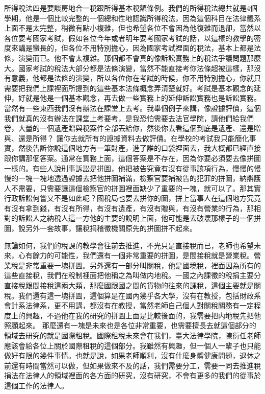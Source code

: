 \documentclass[]{ctexbook}
\begin{document}
所得稅法四是要談房地合一稅跟所得基本稅額條例。我們的所得稅法總共就是4個學期，他是一個比較完整的一個總和性地認識所得稅法，因為這個科目在法律體系上面不是太完整，稍微有點小複雜，但也希望各位不會因為他復雜而退卻，當然以各位要考國家考試，假如各位今年或者明年要考國家考試的話，以這樣的教學的密度來講是蠻長的，但各位不用特別擔心，因為國家考試裡面的稅法，基本上都是法條，演變而已。他不會太複雜。那個都不會真的像訴訟實務上的稅法爭議問題那麼大。國家考試的稅法大部分都是法條演變，當然不能直接考你法條超被這樣，那沒有意義，他都是法條的演變，所以各位你在考試的時候，你不用特別擔心，你就只需要把我們上課裡面所提到的這些基本法條概念弄清楚就好。考試是基本觀念的延伸，好就是他是一個基本觀念，再去做一些實務上的延伸訴訟實務也是訴訟實務。當然有一些東西我們沒有辦法在課堂上去考。我舉個例子來講，像證據評價，這個我們就真的沒有辦法在課堂上考要考，是我恐怕需要去法官學院，請他們給我們卷，大量的一個遺產贈與稅案件全部丟給你，然後你去看這個到底是遺產、還是贈與、還是所得？ 讓你去就所有的證據資料去做評價。在學校的考試我只能簡化事實，然後告訴你說這個地方有一筆財產，進了誰的口袋裡面去，我大概都已經直接跟你講那個答案。通常在實務上面，這個答案是不存在，因為你要必須要去像拼圖一樣的。有些人說刑事訴訟是拼圖，他把被告究竟有沒有從事該項行為，慢慢的慢慢的一塊一塊地透過證據去把他拼圖補滿，檢察官要補被告的犯罪的拼圖，納辯護人不需要，只需要讓這個檢察官的拼圖裡面缺少了重要的一塊，就可以了。那其實行政訴訟何嘗又不是如此呢？國稅局也要去拼你的圖，拼上當事人在這個地方究竟有沒有拿到錢，有沒有所得，有沒有遺產，有沒有贈與，有沒有營業的行為，那相對的訴訟人之納稅人這一方他的主要的說明上面，他可能是去破壞那樣子的一個拼圖，說另外一套故事，讓稅捐稽徵機關原先的拼圖拼不起來。

無論如何，我們的稅課的教學會往前去推進，不光只是直接稅而已，老師也希望未來，心有餘力的可能性，我們還有一個非常重要的拼圖，是間接稅就是營業稅。營業稅是非常重要一塊拼圖。另外還有一部分叫關稅，他是國境稅，裡面因為所有的這些直接稅，我們在稅制裡面把他稱之為叫做内地稅。一國之內課徵的稅捐主要分直接稅跟間接稅這兩大類，那麼國跟國之間的貨物的往來的課稅，這個主要就是關稅。我們還有這一塊拼圖，這個算是在國內幾乎各大學，沒有在教授，包括財政系會計系法律系，更不用講，都沒有在教授，當然老師自己個人對關稅關務有一定程度上的興趣，不過他在我的研究的拼圖上面是比較後面的，我需要把内地稅先把他照顧起來。
那麼還有一塊是未來也是各位非常重要，也需要擅長去就這個部分的領域去研究的就是國際租稅。國際租稅未來會在我們，臺大法律學院，陳衍任老師應該會給各位上關於國際租稅的這個部分。我雖然有興趣，但一個人一輩子也只能做好有限的幾件事情。也就是說，如果老師順利，沒有什麼身體健康問題，退休之前還有時間當然可以做，但如果做來不及的話，我們需要分工，需要一同去推進稅捐法在法律人的領域裡面的各方面的研究，沒有研究，不會有更多的我們的從事於這個工作的法律人。
\end{document}
